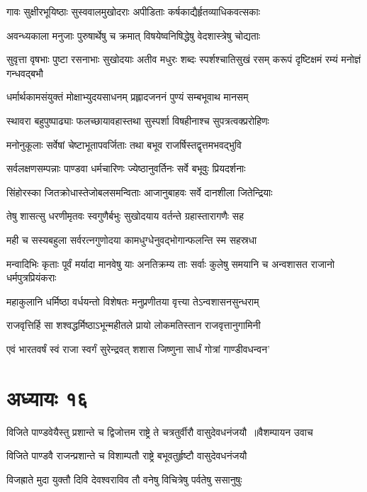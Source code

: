\twolineshloka
{गावः सुक्षीरभूयिष्ठाः सुस्ववालमुखोदराः}
{अपीडिताः कर्षकाद्यैर्हृतव्याधिकवत्सकाः}


\twolineshloka
{अवन्ध्यकाला मनुजाः पुरुषार्थेषु च क्रमात्}
{विषयेष्वनिषिद्धेषु वेदशास्त्रेषु चोद्यताः}


सुवृत्ता वृषभाः पुष्टा रसनाभाः सुखोदयाः
\twolineshloka
{अतीव मधुरः शब्दः स्पर्शश्चातिसुखं रसम्}
{करूपं दृष्टिक्षमं रम्यं मनोज्ञं गन्धवद्बभौ}


\twolineshloka
{धर्मार्थकामसंयुक्तं मोक्षाभ्युदयसाधनम्}
{प्रह्लादजननं पुण्यं सम्बभूवाथ मानसम्}


\twolineshloka
{स्थावरा बहुपुष्पाढ्याः फलच्छायावहास्तथा}
{सुस्पर्शा विषहीनाश्च सुपत्रत्वक्प्ररोहिणः}


\twolineshloka
{मनोनुकूलाः सर्वेषां चेष्टाभूतापवर्जिताः}
{तथा बभूव राजर्षिस्तद्वृत्तमभवद्भुवि}


\twolineshloka
{सर्वलक्षणसम्पन्नाः पाण्डवा धर्मचारिणः}
{ज्येष्ठानुवर्तिनः सर्वे बभूवुः प्रियदर्शनाः}


\twolineshloka
{सिंहोरस्का जितक्रोधास्तेजोबलसमन्विताः}
{आजानुबाहवः सर्वे दानशीला जितेन्द्रियाः}


\twolineshloka
{तेषु शासत्सु धरणीमृतवः स्वगुणैर्बभुः}
{सुखोदयाय वर्तन्ते ग्रहास्तारागणैः सह}


\twolineshloka
{मही च सस्यबहुला सर्वरत्नगुणोदया}
{कामधुग्धेनुवद्भोगान्फलन्ति स्म सहस्रधा}


\threelineshloka
{मन्वादिभिः कृताः पूर्वं मर्यादा मानवेषु याः}
{अनतिक्रम्य ताः सर्वाः कुलेषु समयानि च}
{अन्वशासत राजानो धर्मपुत्रप्रियंकराः}


\twolineshloka
{महाकुलानि धर्मिष्ठा वर्धयन्तो विशेषतः}
{मनुप्रणीतया वृत्त्या तेऽन्वशासनसुन्धराम्}


\twolineshloka
{राजवृत्तिर्हि सा शश्वद्धर्मिष्ठाऽभून्महीतले}
{प्रायो लोकमतिस्तान राजवृत्तानुगामिनी}


\twolineshloka
{एवं भारतवर्षं स्वं राजा स्वर्गं सुरेन्द्रवत्}
{शशास जिष्णुना सार्धं गोत्रां गाण्डीवधन्वन'}


\chapter{अध्यायः १६}
\threelineshloka
{विजिते पाण्डवेयैस्तु प्रशान्ते च द्विजोत्तम}
{राष्ट्रे ते चत्रतुर्वीरौ वासुदेवधनंजयौ ॥वैशम्पायन उवाच}
{}


\twolineshloka
{विजिते पाण्डवै राजन्प्रशान्ते च विशाम्पतौ}
{राष्ट्रे बभूवतुर्हृष्टौ वासुदेवधनंजयौ}


\twolineshloka
{विजह्राते मुदा युक्तौ दिवि देवश्वराविव}
{तौ वनेषु विचित्रेषु पर्वतेषु ससानुषुः}


